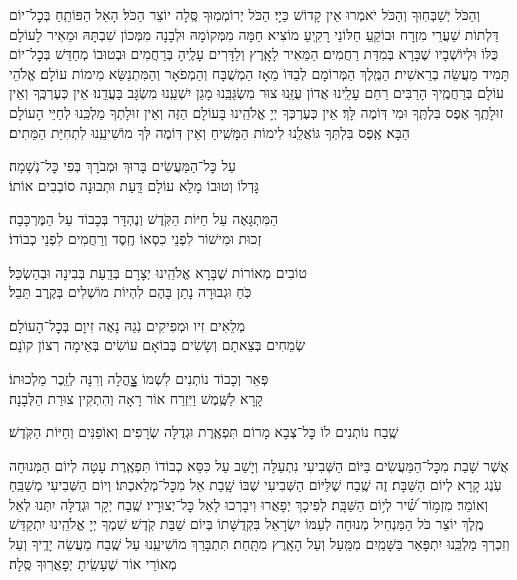 \documentclass[twoside, openany, parskip=half, 11pt]{book}
\begin{document}
וְהַכֹּל יְשַׁבְּחֽוּךָ וְהַכֹּל יֹאמְרוּ אֵין קָדוֹשׁ כַּיָי׃ הַכֹּל יְרוֹמְמֽוּךָ סֶּֽלָה יוֹצֵר הַכֹּל׃ הָאֵל הַפּוֹתֵֽחַ בְּכׇל־יוֹם דַּלְתוֹת שַׁעֲרֵי מִזְרָח
וּבוֹקֵֽעַ חַלּוֹנֵי רָקִֽיעַ מוֹצִיא חַמָּה מִמְּקוֹמָהּ וּלְבָנָה מִמְּכוֹן שִׁבְתָּהּ
וּמֵאִיר לָעוֹלָם כֻּלּוֹ וּלְיוֹשְׁבָיו שֶׁבָּרָא בְּמִדַּת רַחֲמִים׃ הַמֵּאִיר לָאָֽרֶץ וְלַדָּרִים עָלֶֽיהָ בְּרַחֲמִים וּבְטוּבוֹ מְחַדֵּשׁ בְּכׇל־יוֹם תָּמִיד מַעֲשֵׂה בְרֵאשִׁית׃
הַמֶּֽלֶךְ הַמְּרוֹמָם לְבַדּוֹ מֵאָז הַמְשֻׁבָּח וְהַמְפֹאָר וְהַמִּתְנַשֵּׂא מִימוֹת עוֹלָם׃ אֱלֹהֵי עוֹלָם בְּרַחֲמֶֽיךָ הָרַבִּים רַחֵם עָלֵֽינוּ אֲדוֹן עֻזֵּֽנוּ צוּר מִשְׂגַּבֵּֽנוּ מָגֵן יִשְׁעֵֽנוּ מִשְׂגָּב בַּעֲדֵֽנוּ׃
אֵין כְּעֶרְכֶּֽךָ וְאֵין זוּלָתֶֽךָ אֶפֶס בִּלְתֶּֽךָ וּמִי דּֽוֹמֶה לָּךְ׃
אֵין כְּעֶרְכְּךָ יְיָ אֱלֹהֵֽינוּ בָּעוֹלָם הַזֶּה וְאֵין זוּלָתְךָ מַלְכֵּֽנוּ לְחַיֵּי הָעוֹלָם הַבָּא׃
אֶֽפֶס בִּלְתְּךָ גּוֹאֲלֵֽנוּ לִימוֹת הַמָּשִֽׁיחַ וְאֵין דּֽוֹמֶה לְּךָ מוֹשִׁיעֵֽנוּ לִתְחִיַּת הַמֵּתִים׃

עַל כׇּל־הַמַּעֲשִׂים \hfill בָּרוּךְ וּמְבֹרָךְ בְּפִי כׇּל־נְשָׁמָה׃ \\
גׇּדְלוֹ וְטוּבוֹ מָלֵא עוֹלָם \hfill דַּֽעַת וּתְבוּנָה סוֹבְבִים אוֹתוֹ׃

הַמִּתְגָּאֶה עַל חַיּוֹת הַקֹּֽדֶשׁ \hfill וְנֶהְדָּר בְּכָבוֹד עַל הַמֶּרְכָּבָה׃\\
זְכוּת וּמִישׁוֹר לִפְנֵי כִסְאוֹ \hfill חֶֽסֶד וְרַחֲמִים לִפְנֵי כְבוֹדוֹ׃

טוֹבִים מְאוֹרוֹת שֶׁבָּרָא אֱלֹהֵֽינוּ \hfill יְצָרָם בְּדַֽעַת בְּבִינָה וּבְהַשְׂכֵּל׃\\
כֹּֽחַ וּגְבוּרָה נָתַן בָּהֶם \hfill לִהְיוֹת מוֹשְׁלִים בְּקֶֽרֶב תֵּבֵל׃

מְלֵאִים זִיו וּמְפִיקִים נֹֽגַהּ \hfill נָאֶה זִיוָם בְּכׇל־הָעוֹלָם׃ \\
שְׂמֵחִים בְּצֵאתָם וְשָׂשִׂים בְּבוֹאָם \hfill עוֹשִׂים בְּאֵימָה רְצוֹן קוׂנָם׃

פְּאֵר וְכָבוֹד נוֹתְנִים לִשְׁמוֹ \hfill צׇׇׇׇׇהֳלָה וְרִנָּה לְזֵֽכֶר מַלְכוּתוֹ׃ \\
קָרָא לַשֶּֽׁמֶשׁ וַיִּזְרַח אוֹר \hfill רָאָה וְהִתְקִין צוּרַת הַלְּבָנָה׃

שֶֽׁבַח נוֹתְנִים לוֹ כׇּל־צְבָא מָרוֹם \hfill תִּפְאֶֽרֶת וּגְדֻלָּה שְׂרָפִים וְאוֹפַנִּים וְחַיּוֹת הַקֹּֽדֶשׁ׃

אֲשֶׁר שָׁבַת מִכׇּל־הַמַּעֲשִׂים בַּיּוֹם הַשְּׁבִיעִי נִתְעַלָּה וְיָשַׁב עַל כִּסֵּא כְבוֹדוֹ תִּפְאֶֽרֶת עָטָה לְיוֹם הַמְּנוּחָה עֹֽנֶג קָרָא לְיוֹם הַשַּׁבָּת׃ זֶה שֶֽׁבַח שֶׁלַּיּוֹם הַשְּׁבִיעִי שֶׁבּוֹ שָֽׁבַת אֵל מִכׇּל־מְלַאכְתּוֹ׃ וְיוֹם הַשְּׁבִיעִי מְשַׁבֵּֽחַ וְאוֹמֵר׃
%
מִזְמ֥וֹר שִׁ֝֗יר לְי֥וֹם הַשַּׁבָּֽת׃ לְפִיכָךְ יְפָאֲרוּ וִיבָרְכוּ לָאֵל כׇּל־יְצוּרָיו׃ שֶֽׁבַח יְקָר וּגְדֻלָּה יִתְּנוּ לְאֵל מֶֽלֶךְ יוֹצֵר כֹּל הַמַּנְחִיל מְנוּחָה לְעַמּוֹ יִשְׂרָאֵל בִּקְדֻשָּׁתוֹ בְּיוֹם שַׁבַּת קֹֽדֶשׁ׃ שִׁמְךָ יְיָ אֱלֹהֵֽינוּ יִתְקַדַּשׁ וְזִכְרְךָ מַלְכֵּֽנוּ יִתְפָּאַר בַּשָּׁמַֽיִם מִמַּֽעַל וְעַל הָאָֽרֶץ מִתָּֽחַת׃ תִּתְבָּרַךְ מוֹשִׁיעֵֽנוּ עַל שֶֽׁבַח מַעֲשֵׂה יָדֶֽיךָ וְעַל מְאוֹרֵי אוֹר שֶׁעָשִֽׂיתָ יְפָאֲרֽוּךָ סֶּֽלָה׃
\end{document}

